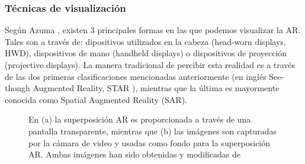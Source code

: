 \documentclass[a4paper,openright,12pt]{report}
\begin{document}
\subsubsection{Técnicas de visualización}
Según Azuma \cite{azuma2001}, existen 3 principales formas en las que podemos visualizar la AR. Tales son a través de: dipositivos utilizados en la cabeza (head-worn displays, HWD), dispositivos de mano (handheld displays) o dispositivos de proyección (projective displays). La manera tradicional de percibir esta realidad es a través de las dos primeras clasificaciones mencionadas anteriormente (en inglés See-though Augmented Reality, STAR \cite{Sol2016}), mientras que la última es mayormente conocida como Spatial Augmented Reality (SAR).\\
\begin{figure}[thbp]
	\centering
	\caption[Funcionamiento de los HMD's]{En (a) la superposición AR es proporcionada a través de una pantalla transparente, mientras que (b) las imágenes son capturadas por la cámara de video y usadas como fondo para la superposición AR. Ambas imágenes han sido obtenidas y modificadas de \cite{azuma1997} } \label{fig:opticalvideo}
\end{figure}
\end{document}
